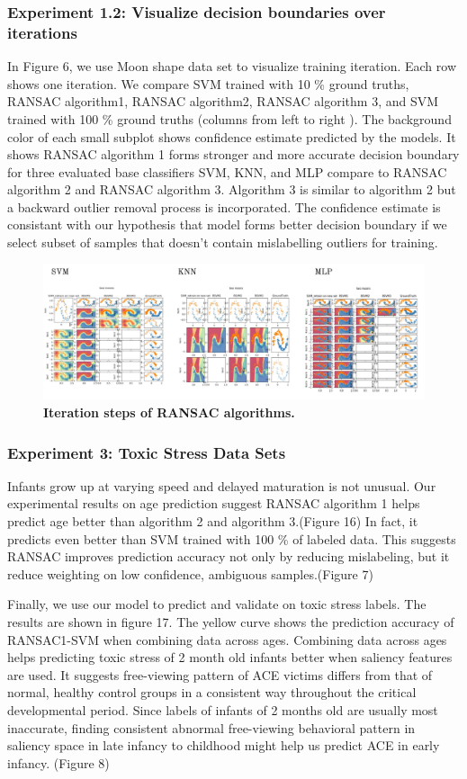 \documentclass[a4paper, times, 12pt, ,onecolumn,oneside,top=1.0cm,bottom=1.0cm,left=1.0 cm,right=1cm]{article}
\begin{document}
\subsubsection{Experiment 1.2: Visualize decision boundaries over iterations}
In Figure 6, we use Moon shape data set to visualize training iteration. Each row shows one iteration. We compare SVM trained with 10 \% ground truths, RANSAC algorithm1, RANSAC algorithm2,  RANSAC algorithm 3,  and SVM trained with 100 \% ground truths (columns from left to right ). The background color of each small subplot shows confidence estimate predicted by the models. It shows RANSAC algorithm 1 forms stronger and more accurate decision boundary for three evaluated base classifiers SVM, KNN, and MLP compare to RANSAC algorithm 2 and RANSAC algorithm 3. Algorithm 3 is similar to algorithm 2 but a backward outlier removal process is incorporated. The confidence estimate is consistant with our hypothesis that model forms better decision boundary if we select subset of samples that doesn't contain mislabelling outliers for training.      
\begin{figure}[ht]
  \centering
  \includegraphics[scale = 0.25]{imgs/exp1-3-0.png}
  \caption{ \textbf{Iteration steps of RANSAC algorithms.}}
\end{figure}
\subsubsection{Experiment 3: Toxic Stress Data Sets}
Infants grow up at varying speed and delayed maturation is not unusual. Our experimental results on age prediction suggest RANSAC algorithm 1 helps predict age better than algorithm 2 and algorithm 3.(Figure 16) In fact, it predicts even better than SVM trained with 100 \% of labeled data. This suggests RANSAC improves prediction accuracy not only by reducing mislabeling, but it reduce weighting on low confidence, ambiguous samples.(Figure 7)

Finally, we use our model to predict and validate on toxic stress labels. The results are shown in figure 17. The yellow curve shows the prediction accuracy of RANSAC1-SVM when combining data across ages. Combining data across ages helps predicting toxic stress of 2 month old infants better when saliency features are used. It suggests free-viewing pattern of ACE victims differs from that of normal, healthy control groups in a consistent way throughout the critical developmental period. Since labels of infants of 2 months old are usually most inaccurate, finding consistent abnormal free-viewing behavioral pattern in saliency space in late infancy to childhood might help us predict ACE in early infancy. (Figure 8)       
\end{document}
